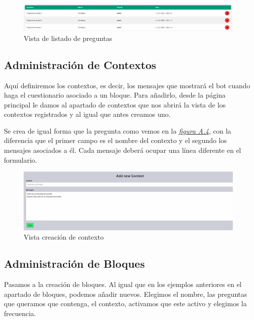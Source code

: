 \begin{figure}[!ht]
    \centering
    \includegraphics[width=1\textwidth]{imagenes/list_pregunta_a.png}
    \caption{ Vista de listado de preguntas }
    \label{fig:planificacion}
\end{figure}\vspace{1cm}

\subsection{Administración de Contextos}

Aquí definiremos los contextos, es decir, los mensajes que mostrará el bot cuando haga el cuestionario asociado a un bloque. Para añadirlo, desde la página principal le damos al apartado de contextos que nos abrirá la vista de los contextos registrados y al igual que antes creamos uno. 

Se crea de igual forma que la pregunta como vemos en la \textit{\hyperref[fig:creacion_contexto]{figura A.4}}, con la diferencia que el primer campo es el nombre del contexto y el segundo los mensajes asociados a él. Cada mensaje deberá ocupar una línea diferente en el formulario. \vspace{2cm}

\begin{figure}[!ht]
    \centering
    \includegraphics[width=1\textwidth]{imagenes/add_context_a.png}
    \caption{ Vista creación de contexto }
    \label{fig:creacion_contexto}
\end{figure}

\subsection{Administración de Bloques}

Pasamos a la creación de bloques. Al igual que en los ejemplos anteriores en el apartado de bloques, podemos añadir nuevos. Elegimos el nombre, las preguntas que queramos que contenga, el contexto, activamos que este activo y elegimos la frecuencia. 

